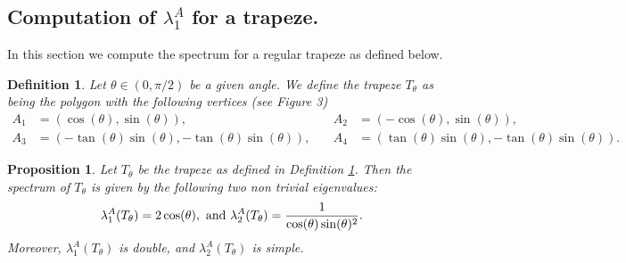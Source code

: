 \documentclass[12pt,english]{smfart} %
\newtheorem{proposition}[theorem]{Proposition}
\newtheorem{definition}[theorem]{Definition}
\theoremstyle{remark}
\begin{document}
    
 
    
 \subsection{Computation of $\lambda_1^A$ for a trapeze.} 

 
 In this section we compute the spectrum for a regular trapeze as defined below.
 \medskip\begin{definition}\label{definitionT} Let $\theta \in (0,\pi/2)$ be a given angle. We define the trapeze $T_\theta$ as being the polygon with the following vertices (see Figure 3)
 \begin{align*}
     A_1&=(\cos(\theta), \sin(\theta) ),  \quad &A_2&=(-\cos(\theta), \sin(\theta) ),\\
     A_3&=(-\tan(\theta)\sin(\theta) , -\tan(\theta)\sin(\theta)), \quad &A_4&=(\tan(\theta)\sin(\theta) , -\tan(\theta)\sin(\theta)).
 \end{align*}
 \end{definition}
 
 \medskip\begin{proposition} \label{calculLambda1}Let $T_\theta$ be the trapeze as defined in Definition \ref{definitionT}.  Then the spectrum of $T_\theta$ is given by the following two non trivial eigenvalues:
 $$\lambda_1^A(T_\theta)=2\cos(\theta), \textnormal{ and }
\lambda_2^A(T_\theta)=\frac{1}{\cos(\theta)\sin(\theta)^2}.$$
 Moreover, $\lambda_1^A(T_\theta)$ is double, and $\lambda_2^A(T_\theta)$ is simple.
 \end{proposition}
 
\end{document}
